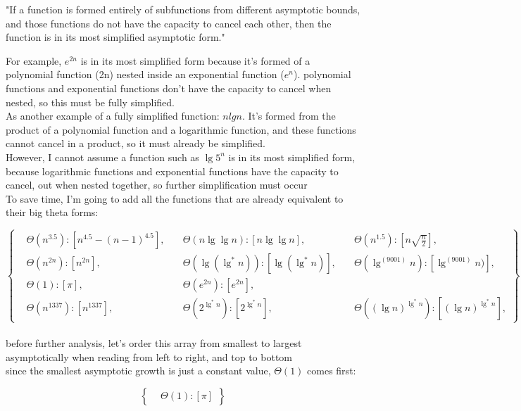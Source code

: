 \documentclass[11pt,fleqn]{article}
\theoremstyle{definition}
\theoremstyle{remark}
\begin{document}
"If a function is formed entirely of subfunctions from different 
asymptotic bounds, and those functions do not have the capacity
to cancel each other, then the function is in its most simplified 
asymptotic form."

For example, $e^{2n}$ is in its most simplified form because it's 
formed of a polynomial function (2n) 
nested inside an exponential function ($e^n$).
polynomial functions and exponential functions don't have the capacity
to cancel when nested, so this must be fully simplified.\\ 

As another example of a fully simplified function: $nlgn$. It's formed
from the product of a polynomial function and a logarithmic function, and
these functions cannot cancel in a product, so it must already be simplified.\\

However, I cannot assume a function such as $\lg 5^n$ is in its most 
simplified form, because logarithmic functions and exponential functions
have the capacity to cancel, out when nested together, so further 
simplification must occur\\

To save time, I'm going to add all the functions that are already 
equivalent to their big theta forms:

\[
\left\{
\begin{aligned}
& \Theta(n^{3.5}): [n^{4.5} - (n - 1)^{4.5}], 
& \quad \Theta(n \lg \lg n): [n \lg \lg n],
& \quad \Theta(n^{1.5}): [n\sqrt{\frac{n}{2}}],\\
& \Theta(n^{2n}): [n^{2n}],
& \quad \Theta(\lg(\lg^*n)): [\lg(\lg^*n)],
& \quad \Theta(\lg^{(9001)} n): [\lg^{(9001)} n)],\\
& \Theta(1): [\pi],
& \quad \Theta(e^{2n}): [e^{2n}],\\
& \Theta(n^{1337}): [n^{1337}],
& \quad \Theta(2^{\lg^*{n}}): [2^{\lg^*{n}}],
& \quad \Theta({(\lg n)}^{\lg^*{n}}): [{(\lg n)}^{\lg^*{n}}],
\end{aligned}
\right\}
\]\\

before further analysis, let's order this array from smallest
to largest asymptotically when reading from left to right, and top 
to bottom\\

since the smallest asymptotic growth is just a constant value,
$\Theta(1)$ comes first:

\[
\left\{
\begin{aligned}
& \Theta(1): [\pi]
\end{aligned}
\right\}
\]
\end{document}
